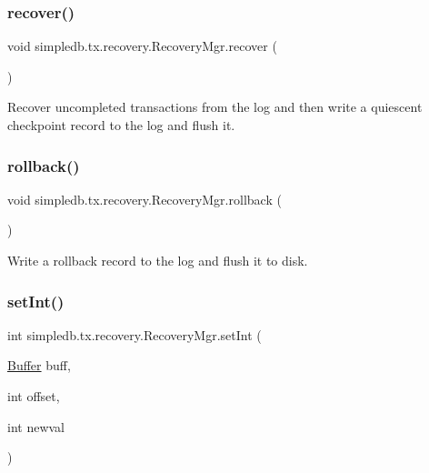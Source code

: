 \subsubsection{\texorpdfstring{recover()}{recover()}}
{\footnotesize\ttfamily void simpledb.\+tx.\+recovery.\+Recovery\+Mgr.\+recover (\begin{DoxyParamCaption}{ }\end{DoxyParamCaption})\hspace{0.3cm}{\ttfamily [inline]}}

Recover uncompleted transactions from the log and then write a quiescent checkpoint record to the log and flush it. \mbox{\label{classsimpledb_1_1tx_1_1recovery_1_1RecoveryMgr_a4fd081a3a950886ce87ba6987199cfc6}} 
\subsubsection{\texorpdfstring{rollback()}{rollback()}}
{\footnotesize\ttfamily void simpledb.\+tx.\+recovery.\+Recovery\+Mgr.\+rollback (\begin{DoxyParamCaption}{ }\end{DoxyParamCaption})\hspace{0.3cm}{\ttfamily [inline]}}

Write a rollback record to the log and flush it to disk. \mbox{\label{classsimpledb_1_1tx_1_1recovery_1_1RecoveryMgr_af89e8dddf6f248ca53b752f2ff038ddb}} 
\subsubsection{\texorpdfstring{set\+Int()}{setInt()}}
{\footnotesize\ttfamily int simpledb.\+tx.\+recovery.\+Recovery\+Mgr.\+set\+Int (\begin{DoxyParamCaption}\item[{\hyperlink{classsimpledb_1_1buffer_1_1Buffer}{Buffer}}]{buff,  }\item[{int}]{offset,  }\item[{int}]{newval }\end{DoxyParamCaption})\hspace{0.3cm}{\ttfamily [inline]}}

